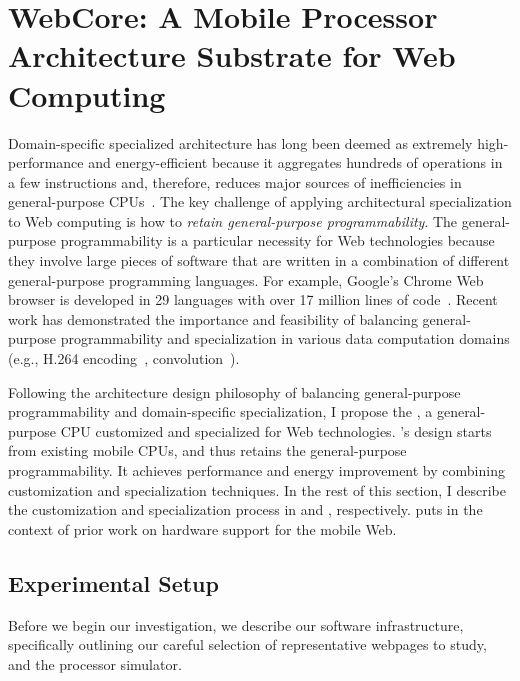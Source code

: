 
\chapter{WebCore: A Mobile Processor Architecture Substrate for Web Computing}
\label{sec:arch}

Domain-specific specialized architecture has long been deemed as extremely high-performance and energy-efficient because it aggregates hundreds of operations in a few instructions and, therefore, reduces major sources of inefficiencies in general-purpose CPUs~\cite{h264,soda,anysp}. The key challenge of applying architectural specialization to Web computing is how to \textit{retain general-purpose programmability}. The general-purpose programmability is a particular necessity for Web technologies because they involve large pieces of software that are written in a combination of different general-purpose programming languages. For example, Google's Chrome Web browser is developed in 29 languages with over 17 million lines of code~\cite{chromeloc}. Recent work has demonstrated the importance and feasibility of balancing general-purpose programmability and specialization in various data computation domains (e.g., H.264 encoding~\cite{h264}, convolution~\cite{ce}).

Following the architecture design philosophy of balancing general-purpose programmability and domain-specific specialization, I propose the \webcore, a general-purpose CPU customized and specialized for Web technologies. \webcore's design starts from existing mobile CPUs, and thus retains the general-purpose programmability. It achieves performance and energy improvement by combining customization and specialization techniques. In the rest of this section, I describe the customization and specialization process in  and , respectively.  puts \webcore in the context of prior work on hardware support for the mobile Web.

\section{Experimental Setup}
\label{sec:arch:exp}

Before we begin our investigation, we describe our software infrastructure, specifically outlining our careful selection of representative webpages to study, and the processor simulator. 

